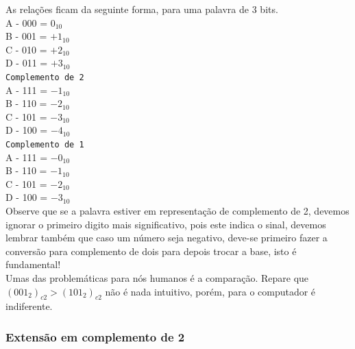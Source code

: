 \documentclass[12pt, onecolumn]{article}
\begin{document}
	\newline
	As relações ficam da seguinte forma, para uma palavra de 3 bits.\\
	\newline
	A - 000 = $0_{10}$\\
	B - 001 = $+1_{10}$\\
	C - 010 = $+2_{10}$\\
	D - 011 = $+3_{10}$\\
	\newline
	\texttt{Complemento de 2}\\
	\newline
	A - 111 = $-1_{10}$\\
	B - 110 = $-2_{10}$\\
	C - 101 = $-3_{10}$\\
	D - 100 = $-4_{10}$\\
	\newline
	\texttt{Complemento de 1}\\
	A - 111 = $-0_{10}$\\
	B - 110 = $-1_{10}$\\ 	
	C - 101 = $-2_{10}$\\ 	
	D - 100 = $-3_{10}$\\
	\newline
	Observe que se a palavra estiver em representação de 
	complemento de 2, devemos ignorar o primeiro digito
	mais significativo, pois este indica o sinal,
	devemos lembrar também que caso um número seja
	negativo, deve-se primeiro fazer a conversão 
	para complemento de dois para depois trocar a base, 
	isto é fundamental! \\
	\newline
	Umas das problemáticas para nós humanos é a comparação.
	Repare que $(001_2)_{c2} > (101_2)_{c2}$ não é nada
	intuitivo, porém, para o computador é indiferente.
	
	\subsubsection{\centering Extensão em complemento de 2}
	
\end{document}

